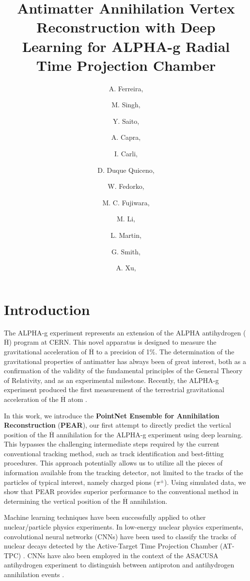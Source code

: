 \documentclass[a4paper,11pt]{article}
\title{\boldmath Antimatter Annihilation Vertex Reconstruction with Deep Learning for ALPHA-g Radial Time Projection Chamber}
\author{A. Ferreira,}
\author{M. Singh,}
\author{Y. Saito,}
\author[1]{A. Capra\note{Corresponding author.},}
\author{I. Carli,}
\author{D. Duque Quiceno,}
\author{W. Fedorko,}
\author{M. C. Fujiwara,}
\author{M. Li,}
\author{L. Martin,}
\author{G. Smith,}
\author{A. Xu,}
\affiliation{TRIUMF,\\
4004 Wesbrook Mall, Vancouver, BC V6T 2A3, Canada}
\begin{document}
\maketitle
\flushbottom

\section{\label{sec:intro}Introduction}
The ALPHA-g experiment represents an extension of the ALPHA antihydrogen ($\overline{\mathrm{H}}$) program at CERN. This novel apparatus is designed to measure the gravitational acceleration of $\overline{\mathrm{H}}$ to a precision of 1\%. The determination of the gravitational properties of antimatter has always been of great interest, both as a confirmation of the validity of the fundamental principles of the General Theory of Relativity, and as an experimental milestone. Recently, the ALPHA-g experiment produced the first measurement of the terrestrial gravitational acceleration of the $\overline{\mathrm{H}}$ atom \cite{anderson2023observation}.

In this work, we introduce the \textbf{PointNet Ensemble for Annihilation Reconstruction} (\textbf{PEAR}), our first attempt to directly predict the vertical position of the $\overline{\mathrm{H}}$ annihilation for the ALPHA-g experiment using deep learning. This bypasses the challenging intermediate steps required by the current conventional tracking method, such as track identification and best-fitting procedures. This approach potentially allows us to utilize all the pieces of information available from the tracking detector, not limited to the tracks of the particles of typical interest, namely charged pions ($\pi^\pm$). Using simulated data, we show that PEAR provides superior performance to the conventional method in determining the vertical position of the $\overline{\mathrm{H}}$ annihilation. 

Machine learning techniques have been successfully applied to other nuclear/particle physics experiments. In low-energy nuclear physics experiments, convolutional neural networks (CNNs) have been used to classify the tracks of nuclear decays detected by the Active-Target Time Projection Chamber (AT-TPC) \cite{Kuchera2019}. CNNs have also been employed in the context of the ASACUSA antihydrogen experiment to distinguish between antiproton and antihydrogen annihilation events \cite{sadowski2017}.
\end{document}
